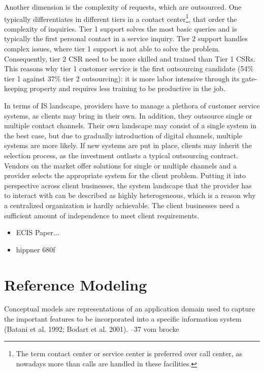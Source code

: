 		Another dimension is the complexity of requests, which are outsourced. One typically differentiates in different tiers in a contact center\footnote{The term contact center or service center is preferred over call center, as nowadays more than calls are handled in these facilities.}, that order the complexity of inquiries. Tier 1 support solves the most basic queries and is typically the first personal contact in a service inquiry. Tier 2 support handles complex issues, where tier 1 support is not able to solve the problem. Consequently, tier 2 \acrshort{CSR} need to be more skilled and trained than Tier 1  \acrshort{CSR}s. This reasons why tier 1 customer service is the first outsourcing candidate (54\% tier 1 against 37\% tier 2 outsourcing\cite{deloitte2014outsourcing}): it is more labor intensive through its gate-keeping property and requires less training to be productive in the job. 
		
		In terms of \acrshort{IS} landscape, providers have to manage a plethora of customer service systems, as clients may bring in their own. In addition, they outsource single or multiple contact channels. Their own landscape may consist of a single system in the best case, but due to gradually introduction of digital channels, multiple systems are more likely. If new systems are put in place, clients may inherit the selection process, as the investment outlasts a typical outsourcing contract. Vendors on the market offer solutions for single or multiple channels and a provider selects the appropriate system for the client problem. Putting it into perspective across client businesses, the system landscape that the provider has to interact with can be described as highly heterogeneous, which is a reason why a centralized organization is hardly achievable. The client businesses need a sufficient amount of independence to meet client requirements. 
		\begin{itemize}
			\item ECIS Paper...

			\item hippner 680f
		\end{itemize}
	\section{Reference Modeling}
	\label{sec:03_refmod}
		
Conceptual models are representations of an application domain used to capture the important features to be incorporated into a specific information system (Batani et al. 1992; Bodart et al. 2001). --37 vom brocke


